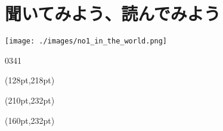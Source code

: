 \documentclass[aspectratio=169,xcolor={dvipsnames,table}]{beamer}
\begin{document}
\section{聞いてみよう、読んでみよう}
\begin{frame}[plain]
 
\texttt{[image: ./images/no1\_in\_the\_world.png]}

\vspace{-30pt}

\hfill{\tiny 0341}\,{\scriptsize {}}

\normalsize
\begin{textblock*}{0.4\linewidth}(128pt,218pt)
\end{textblock*}

\begin{textblock*}{0.4\linewidth}(210pt,232pt)
\end{textblock*}

\begin{textblock*}{0.4\linewidth}(160pt,232pt)
\end{textblock*}


\end{frame}
\end{document}
